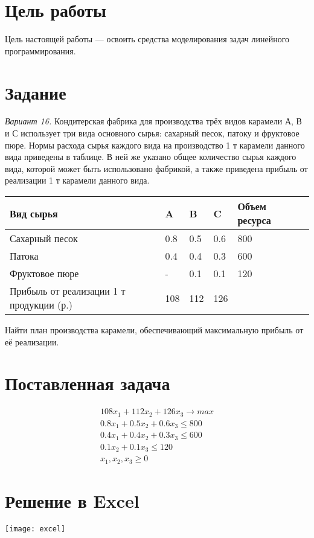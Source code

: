 \section{Цель работы}
Цель настоящей работы --- освоить средства моделирования задач линейного программирования.

\section{Задание}
\textit{Вариант 16.}
Кондитерская фабрика для производства трёх видов карамели А, В и С использует три вида основного сырья: сахарный песок, патоку и фруктовое пюре. Нормы расхода сырья каждого вида на производство 1 т карамели данного вида приведены в таблице.
В ней же указано общее количество сырья каждого вида, которой может быть использовано фабрикой, а также приведена прибыль от реализации 1 т карамели данного вида.

\begin{table}[H]
\begin{tabular}{llllll}
Вид сырья      & A   & B   & C   & Объем ресурса & \\
\hline
Сахарный песок & 0.8 & 0.5 & 0.6 & 800 & \\
Патока         & 0.4 & 0.4 & 0.3 & 600 & \\
Фруктовое пюре & -   & 0.1 & 0.1 & 120 & \\
\hline
Прибыль от реализации 1 т продукции (р.) & 108 & 112 & 126 &
\end{tabular}
\end{table}

Найти план производства карамели, обеспечивающий максимальную прибыль от её реализации.

\section{Поставленная задача}
\begin{gather*}
108x_1 + 112x_2 + 126x_3 \rightarrow max \\
0.8x_1 + 0.5x_2 + 0.6x_3 \le 800 \\
0.4x_1 + 0.4x_2 + 0.3x_3 \le 600 \\
0.1x_2 + 0.1x_3 \le 120 \\
x_1, x_2, x_3 \ge 0
\end{gather*}

\newpage

\section{Решение в Excel}
\texttt{[image: excel]}

